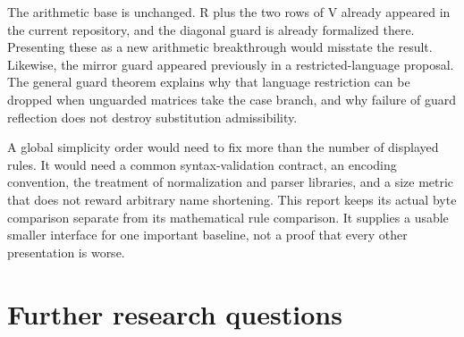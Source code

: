\documentclass[11pt]{article}
\theoremstyle{definition}\newtheorem{definition}[theorem]{Definition}
\theoremstyle{remark}\newtheorem{remark}[theorem]{Remark}
\begin{document}
The arithmetic base is unchanged. R plus the two rows of V already appeared in the current repository, and the diagonal guard is already formalized there. Presenting these as a new arithmetic breakthrough would misstate the result. Likewise, the mirror guard appeared previously in a restricted-language proposal. The general guard theorem explains why that language restriction can be dropped when unguarded matrices take the case branch, and why failure of guard reflection does not destroy substitution admissibility.

A global simplicity order would need to fix more than the number of displayed rules. It would need a common syntax-validation contract, an encoding convention, the treatment of normalization and parser libraries, and a size metric that does not reward arbitrary name shortening. This report keeps its actual byte comparison separate from its mathematical rule comparison. It supplies a usable smaller interface for one important baseline, not a proof that every other presentation is worse.

\section{Further research questions}
\end{document}
